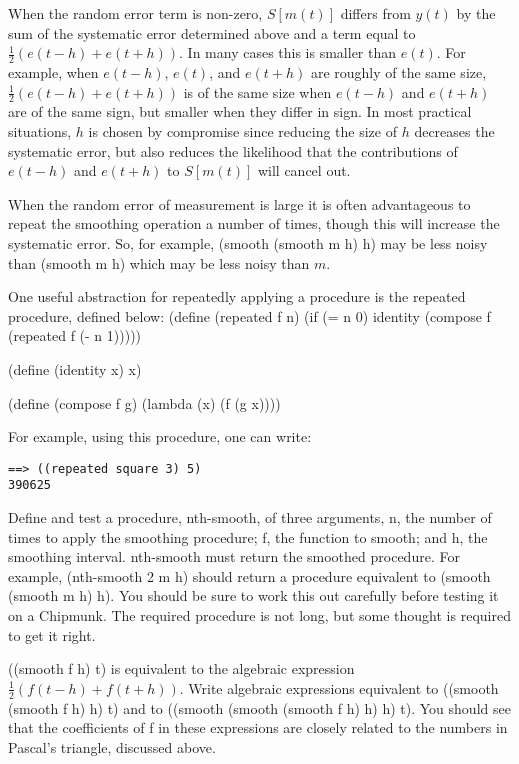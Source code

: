 When the random error term is non-zero, $S[m(t)]$ differs from $y(t)$ by the
sum of the systematic error determined above and a term equal to
$\frac{1}{2}(e(t-h)+e(t+h))$.  In many cases this is smaller than $e(t)$.  For
example, when $e(t-h)$, $e(t)$, and $e(t+h)$ are roughly of the same size,
$\frac{1}{2}(e(t-h)+e(t+h))$ is of the same size when $e(t-h)$ and $e(t+h)$ are
of the same sign, but smaller when they differ in sign. In most practical
situations, $h$ is chosen by compromise since reducing the size of $h$
decreases the systematic error, but also reduces the likelihood that the
contributions of $e(t-h)$ and $e(t+h)$ to $S[m(t)]$ will cancel out.

When the random error of measurement is large it is often advantageous
to repeat the smoothing operation a number of times, though this will
increase the systematic error.  So, for example, {\cf (smooth (smooth m h)
h)} may be less noisy than {\cf (smooth m h)} which may be less noisy than $m$.

One useful abstraction for repeatedly applying a procedure is the
{\cf repeated} procedure, defined below:
\beginlisp
(define (repeated f n)
  (if (= n 0)
      identity
      (compose f (repeated f (- n 1)))))

(define (identity x) x)

(define (compose f g)
  (lambda (x) (f (g x))))
\endlisp

For example, using this procedure, one can write:

\begin{verbatim}
==> ((repeated square 3) 5)
390625
\end{verbatim}


Define and test a procedure, {\cf nth-smooth}, of three arguments, {\cf n}, the
number of times to apply the smoothing procedure; {\cf f}, the function to
smooth; and {\cf h}, the smoothing interval.  {\cf nth-smooth} must return the
smoothed procedure.  For example, {\cf (nth-smooth 2 m h)} should return a
procedure equivalent to {\cf (smooth (smooth m h) h)}.  You should be sure to
work this out carefully before testing it on a Chipmunk.  The required
procedure is not long, but some thought is required to get it right.


{\cf ((smooth f h) t)} is equivalent to the algebraic expression
$\frac{1}{2}(f(t-h)+f(t+h))$.  Write algebraic expressions equivalent to {\cf
((smooth (smooth f h) h) t)} and to {\cf ((smooth (smooth (smooth f h) h) h)
t)}.  You should see that the coefficients of {\cf f} in these expressions are
closely related to the numbers in Pascal's triangle, discussed above.

